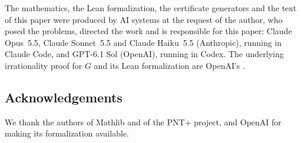 The mathematics, the Lean formalization, the certificate generators and the text of this paper were produced by
AI systems at the request of the author, who posed the problems, directed the work and is responsible for this
paper: Claude Opus~5.5, Claude Sonnet~5.5 and Claude Haiku~5.5 (Anthropic), running in Claude Code, and
GPT-6.1 Sol (OpenAI), running in Codex. The underlying irrationality proof for $G$ and its Lean formalization are
OpenAI's \cite{OpenAI2026}.

\subsection*{Acknowledgements}
We thank the authors of Mathlib and of the PNT+ project, and OpenAI for making its formalization available.
